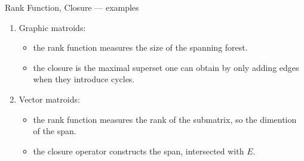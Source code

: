 \documentclass{beamer}
\begin{document}
\begin{frame}{Rank Function, Closure --- examples}
  \begin{enumerate}[<+->]
    \item Graphic matroids:
      \begin{itemize}
        \item the rank function measures the size of the spanning forest.
        \item the closure is the maximal superset one can obtain by only adding edges when they introduce cycles.
      \end{itemize}

    \item Vector matroids: 
      \begin{itemize}
        \item the rank function measures the rank of the submatrix, so the dimention of the span.
        \item the closure operator constructs the span, intersected with $E$.
      \end{itemize}

    \end{enumerate}
\end{frame}
\end{document}
